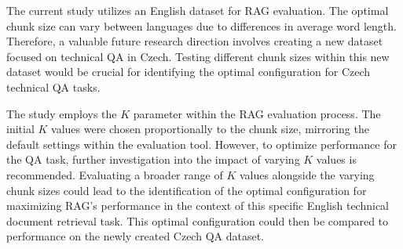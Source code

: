 The current study utilizes an English dataset for \ac{RAG} evaluation.
The optimal chunk size can vary between languages due to differences in average word length.
Therefore, a valuable future research direction involves creating a new dataset focused on technical \ac{QA} in Czech.
Testing different chunk sizes within this new dataset would be crucial for identifying the optimal configuration for Czech technical \ac{QA} tasks.

The study employs the $K$ parameter within the \ac{RAG} evaluation process.
The initial $K$ values were chosen proportionally to the chunk size, mirroring the default settings within the evaluation tool.
However, to optimize performance for the \ac{QA} task, further investigation into the impact of varying $K$ values is recommended.
Evaluating a broader range of $K$ values alongside the varying chunk sizes could lead to the identification of the optimal configuration for maximizing \ac{RAG}'s performance in the context of this specific English technical document retrieval task.
This optimal configuration could then be compared to performance on the newly created Czech \ac{QA} dataset.




